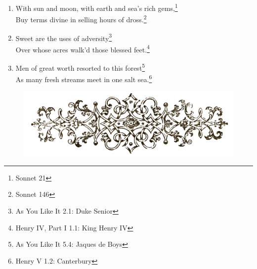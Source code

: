 \documentclass[17pt,twoside]{extarticle}
\begin{document}
\begin{enumerate}
{    IV, Part I 5.4: Prince Henry}
\item
  With sun and moon, with earth and sea's rich gems,\footnote{Sonnet 21}\\Buy
  terms divine in selling hours of dross.\footnote{Sonnet 146}
\item
  Sweet are the uses of adversity\footnote{As You Like It 2.1: Duke
    Senior}\\Over whose acres walk'd those blessed feet.\footnote{Henry
    IV, Part I 1.1: King Henry IV}
\item
  Men of great worth resorted to this forest\footnote{As You Like It
    5.4: Jaques de Boys}\\As many fresh streams meet in one salt
  sea.\footnote{Henry V 1.2: Canterbury}
\end{enumerate}

\vspace{2cm}

\begin{figure}[htbp]
     \centering
     \includegraphics[width=15.5cm]{images/frontispiece.png}
\end{figure}
\end{document}
